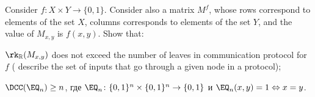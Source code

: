 Consider $f\colon X \times Y \to \{0, 1\}$. Consider also a matrix $M^f$, whose rows correspond to
elements of the set $X$, columns corresponds to elements of the set $Y$, and the value of $M_{x, y}$ is
$f(x, y)$. Show that:
\begin{enumcyr}
    \item $\rk_{\mathbb{R}}(M_{x, y})$ does not exceed the number of leaves in communication protocol for
        $f$ ( describe the set of inputs that go through a given node in a protocol);
    \item $\DCC(\EQ_{n}) \ge n$, где $\EQ_{n}\colon \{0, 1\}^n \times \{0, 1\}^n \to \{0, 1\}$ и
        $\EQ_n(x, y) = 1 \Leftrightarrow x = y$. 
\end{enumcyr}

